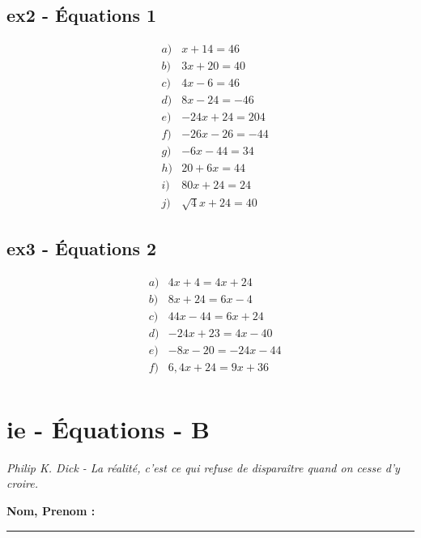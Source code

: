 \documentclass[12pt]{article}
\newcommand{\horrule}[1]{\rule{\linewidth}{#1}} %
\begin{document}
  \begin{multicols}{2}
    \subsection*{ex2 - Équations 1}

    \begin{eqnarray*}
      & a) & x + 14 = 46  \\
      & b) & 3x + 20 = 40  \\
      & c) & 4x - 6  = 46  \\
      & d) & 8x - 24 = -46 \\
      & e) & -24x + 24 = 204 \\
      & f) & -26x - 26 = -44 \\
      & g) & -6x - 44 = 34  \\
      & h) & 20 + 6x = 44  \\
      & i) & 80x + 24 = 24 \\
      & j) & \sqrt{4} x + 24 = 40 
    \end{eqnarray*}


    \subsection*{ex3 - Équations 2}

    \begin{eqnarray*}
      & a) & 4x + 4 = 4x + 24    \\
      & b) & 8x + 24 = 6x - 4     \\
      & c) & 44x - 44 = 6x + 24    \\
      & d) & -24x + 23 = 4x -40     \\
      & e) & -8x - 20 = -24x - 44  \\
      & f) & 6,4x + 24 = 9x + 36    \\
    \end{eqnarray*}
  \end{multicols}

\newpage

\section*{ie - Équations - B}
\begin{center}
  \textit{Philip K. Dick - La réalité, c'est ce qui refuse de disparaître quand on cesse d'y croire.}
\end{center}
\textbf{Nom, Prenom :}\\
\horrule{2px}
\end{document}
